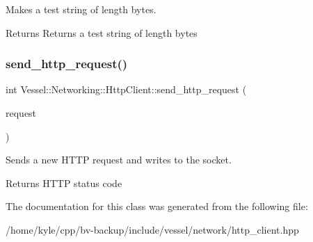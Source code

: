 Makes a test string of length bytes. 

\begin{DoxyReturn}{Returns}
Returns a test string of length bytes 
\end{DoxyReturn}
\mbox{\label{class_vessel_1_1_networking_1_1_http_client_a5aa9df2a1026a4aa10b6e4e51931ba04}} 
\subsubsection{\texorpdfstring{send\+\_\+http\+\_\+request()}{send\_http\_request()}}
{\footnotesize\ttfamily int Vessel\+::\+Networking\+::\+Http\+Client\+::send\+\_\+http\+\_\+request (\begin{DoxyParamCaption}\item[{const \hyperlink{class_vessel_1_1_networking_1_1_http_request}{Http\+Request} \&}]{request }\end{DoxyParamCaption})}



Sends a new H\+T\+TP request and writes to the socket. 

\begin{DoxyReturn}{Returns}
H\+T\+TP status code 
\end{DoxyReturn}


The documentation for this class was generated from the following file\+:\begin{DoxyCompactItemize}
\item 
/home/kyle/cpp/bv-\/backup/include/vessel/network/http\+\_\+client.\+hpp\end{DoxyCompactItemize}
